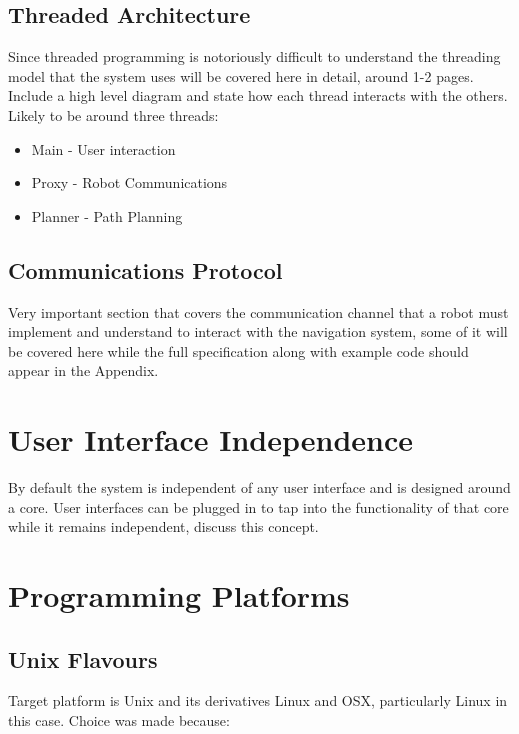 \newpage

\subsection{Threaded Architecture}

\noindent
Since threaded programming is notoriously difficult to understand the threading model that the system uses will be covered here in detail, around 1-2 pages. Include a high level diagram and state how each thread interacts with the others. Likely to be around three threads:

\begin{itemize}
\item Main - User interaction
\item Proxy - Robot Communications
\item Planner - Path Planning
\end{itemize} 

\subsection{Communications Protocol}
Very important section that covers the communication channel that a robot must implement and understand to interact with the navigation system, some of it will be covered here while the full specification along with example code should appear in the Appendix.


\section{User Interface Independence}
By default the system is independent of any user interface and is designed around a core. User interfaces can be plugged in to tap into the functionality of that core while it remains independent, discuss this concept.

\newpage


\section{Programming Platforms}

\subsection{Unix Flavours}
Target platform is Unix and its derivatives Linux and OSX, particularly Linux in this case. Choice was made because:

